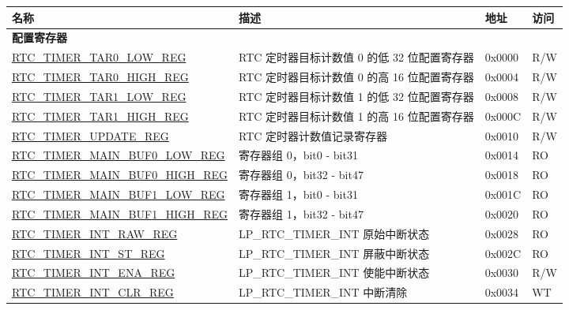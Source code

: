 \begin{longtable}{ | l | l | l | l |}
\hline\rowcolor{lightgray}
\textbf{名称} & \textbf{描述} &  \textbf{地址} & \textbf{访问} \\ \hline
\endhead
\multicolumn{4}{|l|}{\textbf{配置寄存器}} \\ \hline
\hyperref[regdesc:RTCTIMERTAR0LOWREG]{RTC\_TIMER\_TAR0\_LOW\_REG} & RTC 定时器目标计数值 0 的低 32 位配置寄存器 & 0x0000 & R/W \\ \hline
\hyperref[regdesc:RTCTIMERTAR0HIGHREG]{RTC\_TIMER\_TAR0\_HIGH\_REG} & RTC 定时器目标计数值 0 的高 16 位配置寄存器 & 0x0004 & R/W \\ \hline
\hyperref[regdesc:RTCTIMERTAR1LOWREG]{RTC\_TIMER\_TAR1\_LOW\_REG} & RTC 定时器目标计数值 1 的低 32 位配置寄存器 & 0x0008 & R/W \\ \hline
\hyperref[regdesc:RTCTIMERTAR1HIGHREG]{RTC\_TIMER\_TAR1\_HIGH\_REG} & RTC 定时器目标计数值 1 的高 16 位配置寄存器 & 0x000C & R/W \\ \hline
\hyperref[regdesc:RTCTIMERUPDATEREG]{RTC\_TIMER\_UPDATE\_REG} & RTC 定时器计数值记录寄存器 & 0x0010 & R/W \\ \hline
\hyperref[regdesc:RTCTIMERMAINBUF0LOWREG]{RTC\_TIMER\_MAIN\_BUF0\_LOW\_REG} & 寄存器组 0，bit0 - bit31 & 0x0014 & RO \\ \hline
\hyperref[regdesc:RTCTIMERMAINBUF0HIGHREG]{RTC\_TIMER\_MAIN\_BUF0\_HIGH\_REG} & 寄存器组 0，bit32 - bit47 & 0x0018 & RO \\ \hline
\hyperref[regdesc:RTCTIMERMAINBUF1LOWREG]{RTC\_TIMER\_MAIN\_BUF1\_LOW\_REG} & 寄存器组 1，bit0 - bit31 & 0x001C & RO \\ \hline
\hyperref[regdesc:RTCTIMERMAINBUF1HIGHREG]{RTC\_TIMER\_MAIN\_BUF1\_HIGH\_REG} & 寄存器组 1，bit32 - bit47  & 0x0020 & RO \\ \hline
\hyperref[regdesc:RTCTIMERINTRAWREG]{RTC\_TIMER\_INT\_RAW\_REG} & LP\_RTC\_TIMER\_INT 原始中断状态  & 0x0028 & RO \\ \hline
\hyperref[regdesc:RTCTIMERINTSTREG]{RTC\_TIMER\_INT\_ST\_REG} & LP\_RTC\_TIMER\_INT 屏蔽中断状态  & 0x002C & RO \\ \hline
\hyperref[regdesc:RTCTIMERINTENAREG]{RTC\_TIMER\_INT\_ENA\_REG} & LP\_RTC\_TIMER\_INT 使能中断状态  & 0x0030 & R/W \\ \hline
\hyperref[regdesc:RTCTIMERINTCLRREG]{RTC\_TIMER\_INT\_CLR\_REG} & LP\_RTC\_TIMER\_INT 中断清除  & 0x0034 & WT \\ \hline
\end{longtable}
